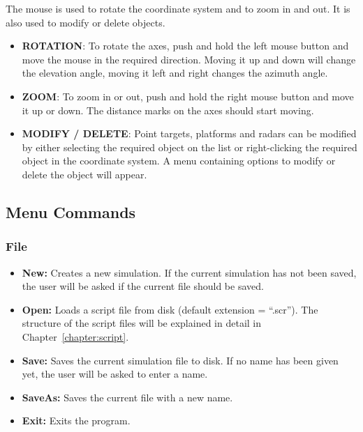 The mouse is used to rotate the coordinate system and to zoom in and out. It
is also used to modify or delete objects.

\begin{itemize}
\item  \textbf{ROTATION}: To rotate the axes, push and hold the left mouse
button and move the mouse in the required direction. Moving it up and down
will change the elevation angle, moving it left and right changes the
azimuth angle.

\item  \textbf{ZOOM}: To zoom in or out, push and hold the right mouse
button and move it up or down. The distance marks on the axes should start
moving.

\item  \textbf{MODIFY / DELETE}: Point targets, platforms and radars can be
modified by either selecting the required object on the list or
right-clicking the required object in the coordinate system. A menu
containing options to modify or delete the object will appear.
\end{itemize}

\subsection{Menu Commands}

\subsubsection{File}

\begin{itemize}
\item  \textbf{New:} Creates a new simulation. If the current simulation has
not been saved, the user will be asked if the current file should be saved.

\item  \textbf{Open:} Loads a script file from disk (default extension =
``.scr''). The structure of the script files will be explained in detail in
Chapter~\ref{chapter:script}.

\item  \textbf{Save:} Saves the current simulation file to disk. If no name
has been given yet, the user will be asked to enter a name.

\item  \textbf{SaveAs:} Saves the current file with a new name.

\item  \textbf{Exit:} Exits the program.
\end{itemize}

